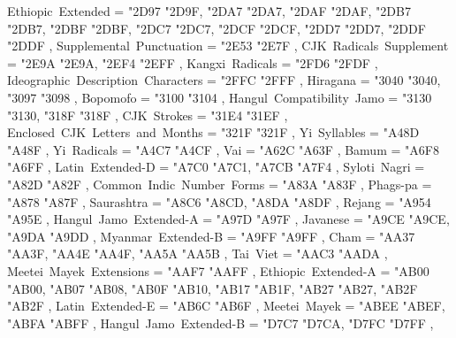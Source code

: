 {    Ethiopic~Extended                              = { {"2D97} {"2D9F}, {"2DA7} {"2DA7}, {"2DAF} {"2DAF}, {"2DB7} {"2DB7}, {"2DBF} {"2DBF}, {"2DC7} {"2DC7}, {"2DCF} {"2DCF}, {"2DD7} {"2DD7}, {"2DDF} {"2DDF} },
    Supplemental~Punctuation                       = { {"2E53} {"2E7F} },
    CJK~Radicals~Supplement                        = { {"2E9A} {"2E9A}, {"2EF4} {"2EFF} },
    Kangxi~Radicals                                = { {"2FD6} {"2FDF} },
    Ideographic~Description~Characters             = { {"2FFC} {"2FFF} },
    Hiragana                                       = { {"3040} {"3040}, {"3097} {"3098} },
    Bopomofo                                       = { {"3100} {"3104} },
    Hangul~Compatibility~Jamo                      = { {"3130} {"3130}, {"318F} {"318F} },
    CJK~Strokes                                    = { {"31E4} {"31EF} },
    Enclosed~CJK~Letters~and~Months                = { {"321F} {"321F} },
    Yi~Syllables                                   = { {"A48D} {"A48F} },
    Yi~Radicals                                    = { {"A4C7} {"A4CF} },
    Vai                                            = { {"A62C} {"A63F} },
    Bamum                                          = { {"A6F8} {"A6FF} },
    Latin~Extended-D                               = { {"A7C0} {"A7C1}, {"A7CB} {"A7F4} },
    Syloti~Nagri                                   = { {"A82D} {"A82F} },
    Common~Indic~Number~Forms                      = { {"A83A} {"A83F} },
    Phags-pa                                       = { {"A878} {"A87F} },
    Saurashtra                                     = { {"A8C6} {"A8CD}, {"A8DA} {"A8DF} },
    Rejang                                         = { {"A954} {"A95E} },
    Hangul~Jamo~Extended-A                         = { {"A97D} {"A97F} },
    Javanese                                       = { {"A9CE} {"A9CE}, {"A9DA} {"A9DD} },
    Myanmar~Extended-B                             = { {"A9FF} {"A9FF} },
    Cham                                           = { {"AA37} {"AA3F}, {"AA4E} {"AA4F}, {"AA5A} {"AA5B} },
    Tai~Viet                                       = { {"AAC3} {"AADA} },
    Meetei~Mayek~Extensions                        = { {"AAF7} {"AAFF} },
    Ethiopic~Extended-A                            = { {"AB00} {"AB00}, {"AB07} {"AB08}, {"AB0F} {"AB10}, {"AB17} {"AB1F}, {"AB27} {"AB27}, {"AB2F} {"AB2F} },
    Latin~Extended-E                               = { {"AB6C} {"AB6F} },
    Meetei~Mayek                                   = { {"ABEE} {"ABEF}, {"ABFA} {"ABFF} },
    Hangul~Jamo~Extended-B                         = { {"D7C7} {"D7CA}, {"D7FC} {"D7FF} },
}

